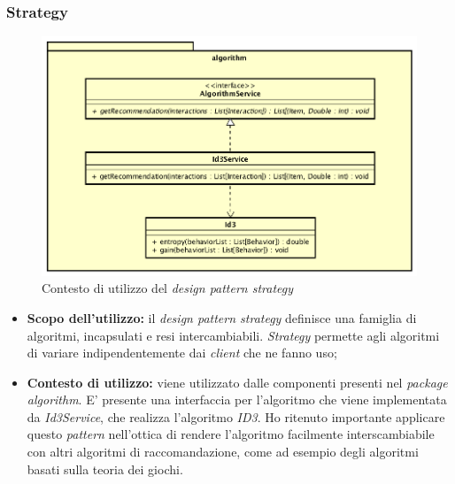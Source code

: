 \subsubsection{Strategy}
\begin{figure}[h]
\centering
\includegraphics[scale=0.30]{immagini/algorithm}
\caption{Contesto di utilizzo del \emph{design pattern strategy}}
\label{fig:pattern-strategy}
\end{figure}
\begin{itemize}
\item\textbf{Scopo dell'utilizzo:} il \emph{design pattern strategy} definisce una famiglia di algoritmi, incapsulati e resi intercambiabili. \emph{Strategy} permette agli algoritmi di variare indipendentemente dai \emph{client} che ne fanno uso;
\item \textbf{Contesto di utilizzo:} viene utilizzato dalle componenti presenti nel \emph{package algorithm}. E' presente una interfaccia per l'algoritmo che viene implementata da \emph{Id3Service}, che realizza l'algoritmo \emph{ID3}. Ho ritenuto importante applicare questo \emph{pattern} nell'ottica di rendere l'algoritmo facilmente interscambiabile con altri algoritmi di raccomandazione, come ad esempio degli algoritmi basati sulla teoria dei giochi.
\end{itemize}
\newpage
